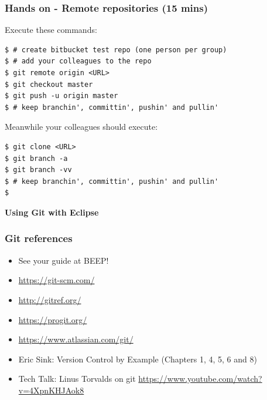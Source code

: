 \documentclass{beamer}
\begin{document}
\begin{frame}[fragile]
\frametitle{Hands on - Remote repositories (15 mins)}

Execute these commands:

\begin{lstlisting}
$ # create bitbucket test repo (one person per group)
$ # add your colleagues to the repo
$ git remote origin <URL>
$ git checkout master
$ git push -u origin master
$ # keep branchin', committin', pushin' and pullin'
\end{lstlisting}

Meanwhile your colleagues should execute:

\begin{lstlisting}
$ git clone <URL>
$ git branch -a
$ git branch -vv
$ # keep branchin', committin', pushin' and pullin'
$ 
\end{lstlisting}


\end{frame}


\begin{frame}
\LARGE	
\textbf{Using Git with Eclipse}
\end{frame}



\begin{frame}
\frametitle{Git references}

\begin{itemize}
\item See your guide at BEEP!
\item \url{https://git-scm.com/}
\item \url{http://gitref.org/}
\item \url{https://progit.org/}
\item \url{https://www.atlassian.com/git/}
\item Eric Sink: Version Control by Example (Chapters 1, 4, 5, 6 and
  8)
\item Tech Talk: Linus Torvalds on git
\url{https://www.youtube.com/watch?v=4XpnKHJAok8}

\end{itemize}

\end{frame}
\end{document}
